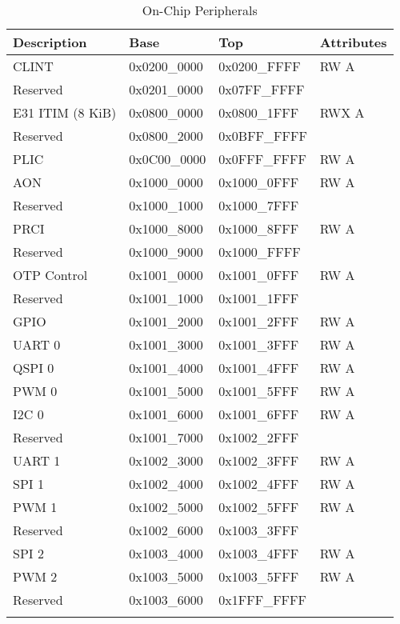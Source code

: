\documentclass[a4paper,12pt,twoside]{report}
\begin{document}
                \begin{longtable}[H]{| p{4.5cm} | p{3cm} | p{3cm} | p{2.5cm} |}
               		\hline
               		\textbf{Description} & \textbf{Base} & \textbf{Top} & \textbf{Attributes}\\
               		\hline
               		\hline
               		\endfirsthead
                    CLINT & 0x0200\_0000 & 0x0200\_FFFF & RW A\\
                    Reserved & 0x0201\_0000 & 0x07FF\_FFFF & \\
                    E31 ITIM (8 KiB) & 0x0800\_0000 & 0x0800\_1FFF & RWX A\\
                    Reserved & 0x0800\_2000 & 0x0BFF\_FFFF & \\
                    PLIC & 0x0C00\_0000 & 0x0FFF\_FFFF & RW A\\
                    AON & 0x1000\_0000 & 0x1000\_0FFF & RW A\\
               		Reserved & 0x1000\_1000 & 0x1000\_7FFF & \\
               		PRCI & 0x1000\_8000 & 0x1000\_8FFF & RW A\\
               		Reserved & 0x1000\_9000 & 0x1000\_FFFF & \\
               		OTP Control & 0x1001\_0000 & 0x1001\_0FFF & RW A\\
               		Reserved & 0x1001\_1000 & 0x1001\_1FFF & \\
               		GPIO & 0x1001\_2000 & 0x1001\_2FFF & RW A\\
               		UART 0 & 0x1001\_3000 & 0x1001\_3FFF & RW A\\
               		QSPI 0 & 0x1001\_4000 & 0x1001\_4FFF & RW A\\
               		PWM 0 & 0x1001\_5000 & 0x1001\_5FFF & RW A\\
               		I2C 0 & 0x1001\_6000 & 0x1001\_6FFF & RW A\\
               		Reserved & 0x1001\_7000 & 0x1002\_2FFF & \\
               		UART 1 & 0x1002\_3000 & 0x1002\_3FFF & RW A\\
               		SPI 1 & 0x1002\_4000 & 0x1002\_4FFF & RW A\\
               		PWM 1 & 0x1002\_5000 & 0x1002\_5FFF & RW A\\
               		Reserved & 0x1002\_6000 & 0x1003\_3FFF & \\
               		SPI 2 & 0x1003\_4000 & 0x1003\_4FFF & RW A\\
               		PWM 2 & 0x1003\_5000 & 0x1003\_5FFF & RW A\\
               		Reserved & 0x1003\_6000 & 0x1FFF\_FFFF & \\
               		\hline
               		\caption{On-Chip Peripherals}
                \end{longtable}
\end{document}
